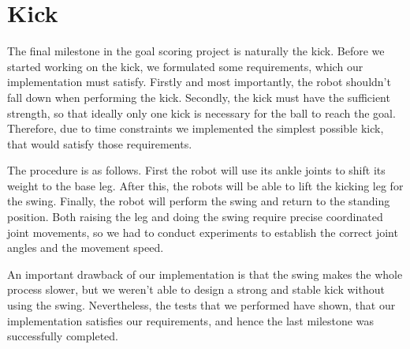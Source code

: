 \section{Kick}

The final milestone in the goal scoring project is naturally the kick. Before
we started working on the kick, we formulated some requirements, which our
implementation must satisfy. Firstly and most importantly, the robot shouldn't
fall down when performing the kick. Secondly, the kick must have the sufficient
strength, so that ideally only one kick is necessary for the ball to reach the
goal. Therefore, due to time constraints we implemented the simplest possible
kick, that would satisfy those requirements.

The procedure is as follows. First the robot will use its ankle joints to shift
its weight to the base leg. After this, the robots will be able to lift the
kicking leg for the swing. Finally, the robot will perform the swing and return
to the standing position. Both raising the leg and doing the swing require
precise coordinated joint movements, so we had to conduct experiments to
establish the correct joint angles and the movement speed.

An important drawback of our implementation is that the swing makes the whole
process slower, but we weren't able to design a strong and stable kick without
using the swing. Nevertheless, the tests that we performed have shown, that our
implementation satisfies our requirements, and hence the last milestone was
successfully completed.

